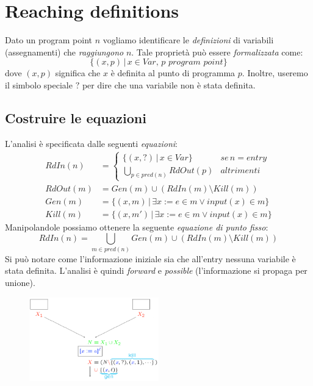 \documentclass[a4paper,oneside,titlepage]{book}
\begin{document}
\section{Reaching definitions} %
\label{rd1}
Dato un program point $n$ vogliamo identificare le \textit{definizioni} di variabili (assegnamenti) che \textit{raggiungono} $n$. Tale proprietà può essere \textit{formalizzata} come:
\[ \{ (x,p) \, | \, x \in Var, \, p \,\,program \,\, point \} \]
dove $(x,p)$ significa che $x$ è definita al punto di programma $p$. Inoltre, useremo il simbolo speciale $?$ per dire che una variabile non è stata definita.

\subsection{Costruire le equazioni}
\label{rd2}
L'analisi è specificata dalle seguenti \textit{equazioni}:
\begin{align*}
	RdIn(n) &=
	\begin{cases}
		\{ (x,?) \, | \, x \in Var \} & se \, n=entry \\
		\bigcup_{p \in pred(n)} RdOut(p) & altrimenti
	\end{cases} \\
	RdOut(m) &= Gen(m) \cup (RdIn(m) \setminus Kill(m)) \\
	Gen(m) &= \{ (x,m) \, | \, \exists x := e \in m \vee input(x) \in m \} \\
    Kill(m) &= \{ (x,m') \, | \, \exists x := e \in m \vee input(x) \in m \}
\end{align*}
Manipolandole possiamo ottenere la seguente \textit{equazione di punto fisso}:
\[ RdIn(n) = \bigcup_{m \in pred(n)} Gen(m) \cup (RdIn(m) \setminus Kill(m)) \]
Si può notare come l'informazione iniziale sia che all'entry nessuna variabile è stata definita. L'analisi è quindi \textit{forward} e \textit{possible} (l'informazione si propaga per unione).
\begin{figure}[htp]
	\centering
	\includegraphics[width=0.5\textwidth]{rd1.png}
\end{figure}
\end{document}
